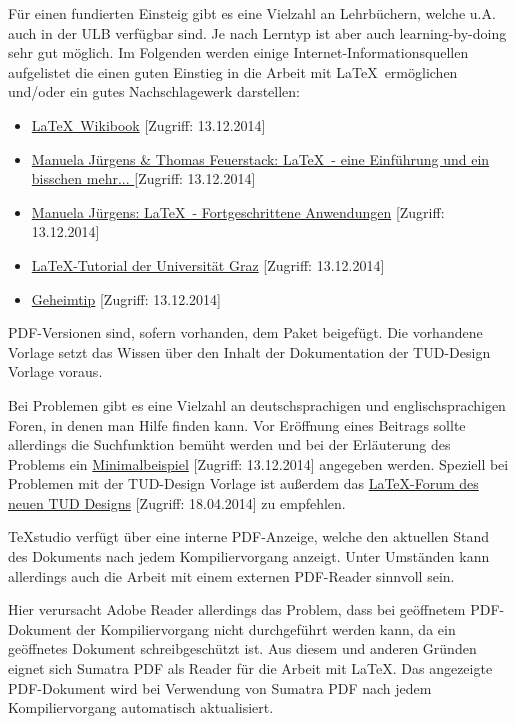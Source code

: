 Für einen fundierten Einsteig gibt es eine Vielzahl an Lehrbüchern, welche u.A. auch in der ULB verfügbar sind. Je nach Lerntyp ist aber auch learning-by-doing sehr gut möglich. Im Folgenden werden einige Internet-Informationsquellen aufgelistet die einen guten Einstieg in die Arbeit mit \LaTeX\ ermöglichen und/oder ein gutes Nachschlagewerk darstellen:
\begin{itemize}
	\item \href{http://en.wikibooks.org/wiki/LaTeX}{\LaTeX\ Wikibook} [Zugriff: 13.12.2014]
	\item \href{http://www.fernuni-hagen.de/imperia/md/content/zmi_2010/a026_latex_einf.pdf}{Manuela Jürgens \& Thomas Feuerstack: \LaTeX\ - eine Einführung und ein bisschen mehr... } [Zugriff: 13.12.2014]
	\item \href{ftp://ftp.fernuni-hagen.de/pub/pdf/urz-broschueren/broschueren/a0279510.pdf}{Manuela Jürgens: \LaTeX\ - Fortgeschrittene Anwendungen} [Zugriff: 13.12.2014]
	\item \href{http://latex.tugraz.at/latex/tutorial}{\LaTeX-Tutorial der Universität Graz} [Zugriff: 13.12.2014]
	\item \href{http://www.gidf.de/}{Geheimtip} [Zugriff: 13.12.2014]
\end{itemize}
PDF-Versionen sind, sofern vorhanden, dem Paket beigefügt. Die vorhandene Vorlage setzt das Wissen über den Inhalt der Dokumentation der TUD-Design Vorlage voraus.

Bei Problemen gibt es eine Vielzahl an deutschsprachigen und englischsprachigen Foren, in denen man Hilfe finden kann. Vor Eröffnung eines Beitrags sollte allerdings die Suchfunktion bemüht werden und bei der Erläuterung des Problems ein \href{http://www.golatex.de/wiki/Minimalbeispiel}{Minimalbeispiel} [Zugriff: 13.12.2014] angegeben werden. Speziell bei Problemen mit der TUD-Design Vorlage ist außerdem das \href{http://tuddesign-latex.fs-etit.de/index.php}{LaTeX-Forum des neuen TUD Designs} [Zugriff: 18.04.2014] zu empfehlen.

TeXstudio verfügt über eine interne PDF-Anzeige, welche den aktuellen Stand des Dokuments nach jedem Kompiliervorgang anzeigt. Unter Umständen kann allerdings auch die Arbeit mit einem externen PDF-Reader sinnvoll sein. 

Hier verursacht Adobe Reader allerdings das Problem, dass bei geöffnetem PDF-Dokument der Kompiliervorgang nicht durchgeführt werden kann, da ein geöffnetes Dokument schreibgeschützt ist. Aus diesem und anderen Gründen eignet sich Sumatra PDF als Reader für die Arbeit mit \LaTeX. Das angezeigte PDF-Dokument wird bei Verwendung von Sumatra PDF nach jedem Kompiliervorgang automatisch aktualisiert. 

